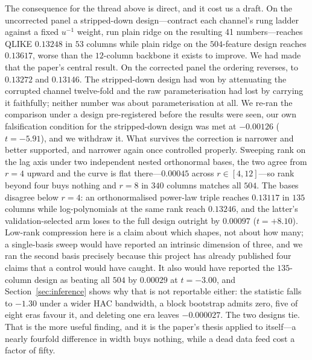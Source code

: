 The consequence for the thread above is direct, and it cost us a draft. On the uncorrected panel a stripped-down design---contract each channel's rung ladder against a fixed $u^{-1}$ weight, run plain ridge on the resulting 41 numbers---reaches QLIKE $0.13248$ in $53$ columns while plain ridge on the $504$-feature design reaches $0.13617$, worse than the $12$-column backbone it exists to improve. We had made that the paper's central result. On the corrected panel the ordering reverses, to $0.13272$ and $0.13146$. The stripped-down design had won by attenuating the corrupted channel twelve-fold and the raw parameterisation had lost by carrying it faithfully; neither number was about parameterisation at all. We re-ran the comparison under a design pre-registered before the results were seen, our own falsification condition for the stripped-down design was met at $-0.00126$ ($t = -5.91$), and we withdraw it. What survives the correction is narrower and better supported, and narrower again once controlled properly. Sweeping rank on the lag axis under two independent nested orthonormal bases, the two agree from $r = 4$ upward and the curve is flat there---$0.00045$ across $r \in [4, 12]$---so rank beyond four buys nothing and $r = 8$ in $340$ columns matches all $504$. The bases disagree below $r = 4$: an orthonormalised power-law triple reaches $0.13117$ in $135$ columns while log-polynomials at the same rank reach $0.13246$, and the latter's validation-selected arm loses to the full design outright by $0.00097$ ($t = +8.10$). Low-rank compression here is a claim about which shapes, not about how many; a single-basis sweep would have reported an intrinsic dimension of three, and we ran the second basis precisely because this project has already published four claims that a control would have caught. It also would have reported the $135$-column design as beating all $504$ by $0.00029$ at $t = -3.00$, and Section~\ref{sec:inference} shows why that is not reportable either: the statistic falls to $-1.30$ under a wider HAC bandwidth, a block bootstrap admits zero, five of eight eras favour it, and deleting one era leaves $-0.000027$. The two designs tie. That is the more useful finding, and it is the paper's thesis applied to itself---a nearly fourfold difference in width buys nothing, while a dead data feed cost a factor of fifty.

